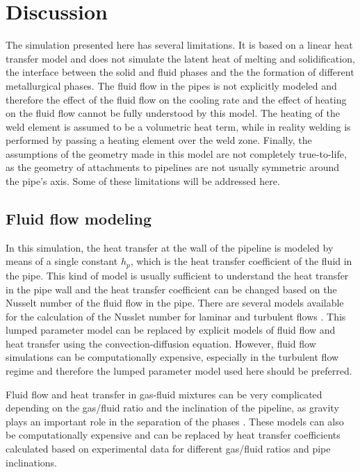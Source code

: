 \documentclass{article}
\makeatletter
\newcommand{\autocitel}[1]{\autocite{#1}\checknextarg}
\newcommand{\checknextarg}{\@ifnextchar\bgroup{\gobblenextarg}{}}
\newcommand{\gobblenextarg}[1]{$^,$\autocite{#1}\@ifnextchar\bgroup{\gobblenextarg}{}}
\makeatother
\begin{document}
\section{Discussion}
The simulation presented here has several limitations. It is based on a linear heat transfer model and does not simulate the latent heat of melting and solidification, the interface between the solid and fluid phases and the the formation of different metallurgical phases. The fluid flow in the pipes is not explicitly modeled and therefore the effect of the fluid flow on the cooling rate and the effect of heating on the fluid flow cannot be fully understood by this model. The heating of the weld element is assumed to be a volumetric heat term, while in reality welding is performed by passing a heating element over the weld zone. Finally, the assumptions of the geometry made in this model are not completely true-to-life, as the geometry of attachments to pipelines are not usually symmetric around the pipe's axis. Some of these limitations will be addressed here. 

\subsection{Fluid flow modeling}
In this simulation, the heat transfer at the wall of the pipeline is modeled by means of a single constant $h_p$, which is the heat transfer coefficient of the fluid in the pipe. This kind of model is usually sufficient to understand the heat transfer in the pipe wall and the heat transfer coefficient can be changed based on the Nusselt number of the fluid flow in the pipe. There are several models available for the calculation of the Nusslet number for laminar and turbulent flows \autocitel{nagy2018basic}. This lumped parameter model can be replaced by explicit models of fluid flow and heat transfer using the convection-diffusion equation. However, fluid flow simulations can be computationally expensive, especially in the turbulent flow regime and therefore the lumped parameter model used here should be preferred.

Fluid flow and heat transfer in gas-fluid mixtures can be very complicated depending on the gas/fluid ratio and the inclination of the pipeline, as gravity plays an important role in the separation of the phases \autocitel{zhang2006unified}. These models can also be computationally expensive and can be replaced by heat transfer coefficients calculated based on experimental data for different gas/fluid ratios and pipe inclinations\autocitel{kim1999comparison}{kim2002heat}{ghajar2010importance}. 
 
\end{document}
